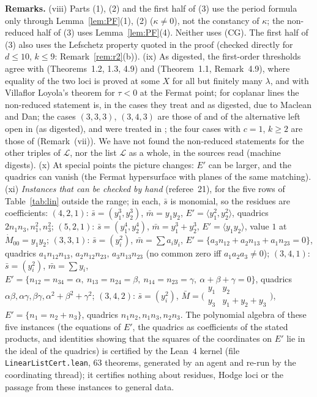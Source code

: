 \documentclass[11pt]{article}
\numberwithin{equation}{section}
\theoremstyle{remark}
\newcommand{\run}[1]{\medskip\noindent\textbf{#1}}
\begin{document}
\run{Remarks.} (viii) Parts (1), (2) and the first half of (3) use the period formula only through
Lemma~\ref{lem:PF}(1), (2) ($\kappa\ne0$), not the constancy of $\kappa$; the non-reduced half of
(3) uses Lemma~\ref{lem:PF}(4). Neither uses (CG). The first half of (3) also uses the Lefschetz property quoted in the
proof (checked directly for $d\le10$, $k\le9$: Remark~\ref{rem:r2}(b)). (ix) As digested, the first-order thresholds
agree with \cite{Kl} (Theorems~1.2, 1.3, 4.9) and \cite{Kl2} (Theorem~1.1, Remark~4.9), where equality of the two
loci is proved at some $X$ for all but finitely many $\lambda$, and with Villaflor Loyola's theorem for
$\tau<0$ at the Fermat point; for coplanar lines the non-reduced statement is, in the cases they treat and as
digested, due to Maclean and Dan; the cases $(3,3,3)$, $(3,4,3)$ are those of \cite[Conj.~1]{Mo} and of the
alternative left open in \cite[Thm.~1.3]{Kl} (as digested), and were treated in \cite{P1}; the four cases with
$c=1$, $k\ge2$ are those of \cite[Remark~4.9]{Kl2} (Remark~(vii)). We have not found the
non-reduced statements for the other triples of $\mathcal L$, nor the list $\mathcal L$ as a whole, in the
sources read (machine digests). (x) At special points the picture changes: $E'$ can be larger, and the
quadrics can vanish (the Fermat hypersurface with planes of the same matching). (xi) \emph{Instances that can
be checked by hand} (referee~21), for the five rows of Table~\ref{tab:lin} outside the range; in each,
$\bar s$ is monomial, so the residues are coefficients:
$(4,2,1)$: $\bar s=(y_1^3,y_2^3)$, $\bar m=y_1y_2$, $E'=\langle y_1^2,y_2^2\rangle$, quadrics $2n_1n_3,n_1^2,n_3^2$;
$(5,2,1)$: $\bar s=(y_1^4,y_2^4)$, $\bar m=y_1^3+y_2^3$, $E'=\langle y_1y_2\rangle$, value $1$ at $\dot M_{00}=y_1y_2$;
$(3,3,1)$: $\bar s=(y_i^2)$, $\bar m=\sum a_iy_i$, $E'=\{a_3n_{12}+a_2n_{13}+a_1n_{23}=0\}$, quadrics
$a_1n_{12}n_{13}$, $a_2n_{12}n_{23}$, $a_3n_{13}n_{23}$ (no common zero iff $a_1a_2a_3\ne0$);
$(3,4,1)$: $\bar s=(y_i^2)$, $\bar m=\sum y_i$, $E'=\{n_{12}=n_{34}=\alpha,\ n_{13}=n_{24}=\beta,\ n_{14}=n_{23}=\gamma,\
\alpha+\beta+\gamma=0\}$, quadrics $\alpha\beta,\alpha\gamma,\beta\gamma,\alpha^2+\beta^2+\gamma^2$;
$(3,4,2)$: $\bar s=(y_i^2)$, $\bar M=\bigl(\begin{smallmatrix}y_1&y_2\\y_3&y_1+y_2+y_3\end{smallmatrix}\bigr)$,
$E'=\{n_1=n_2+n_3\}$, quadrics $n_1n_2,n_1n_3,n_2n_3$. The polynomial algebra of these five instances (the
equations of $E'$, the quadrics as coefficients of the stated products, and identities showing that the
squares of the coordinates on $E'$ lie in the ideal of the quadrics) is certified by the Lean~4 kernel (file
\texttt{LinearListCert.lean}, $63$ theorems, generated by an agent and re-run by the coordinating thread); it
certifies nothing about residues, Hodge loci or the passage from these instances to general data.
\end{document}
